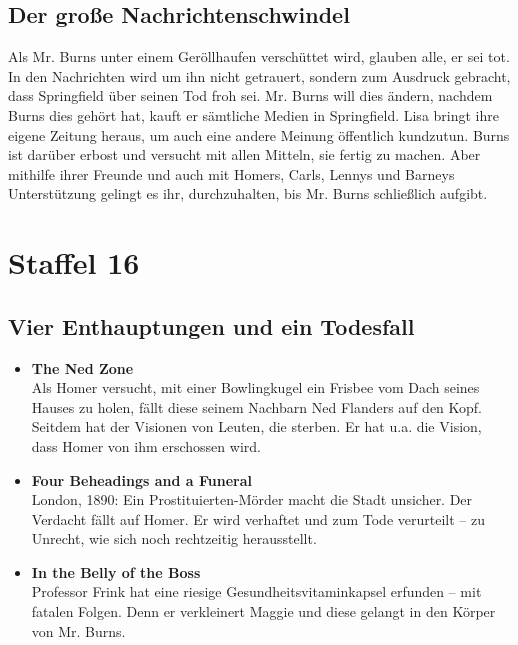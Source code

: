\subsection{Der große Nachrichtenschwindel}
Als Mr. Burns unter einem Geröllhaufen verschüttet wird, glauben alle, er sei tot. In den Nachrichten wird um ihn nicht getrauert, sondern zum Ausdruck gebracht, dass Springfield über seinen Tod froh sei. Mr. Burns will dies ändern, nachdem Burns dies gehört hat, kauft er sämtliche Medien in Springfield. Lisa bringt ihre eigene Zeitung heraus, um auch eine andere Meinung öffentlich kundzutun. Burns ist darüber erbost und versucht mit allen Mitteln, sie fertig zu machen. Aber mithilfe ihrer Freunde und auch mit Homers, Carls, Lennys und Barneys Unterstützung gelingt es ihr, durchzuhalten, bis Mr. Burns schließlich aufgibt.



\section{Staffel 16}
 	
\subsection{Vier Enthauptungen und ein Todesfall}
\begin{itemize}
	\item \textbf{The Ned Zone}\\ Als Homer versucht, mit einer Bowlingkugel ein Frisbee vom Dach seines Hauses zu holen, fällt diese seinem Nachbarn Ned Flanders auf den Kopf. Seitdem hat der Visionen von Leuten, die sterben. Er hat u.a. die Vision, dass Homer von ihm erschossen wird.
	\item \textbf{Four Beheadings and a Funeral}\\ London, 1890: Ein Prostituierten-Mörder macht die Stadt unsicher. Der Verdacht fällt auf Homer. Er wird verhaftet und zum Tode verurteilt -- zu Unrecht, wie sich noch rechtzeitig herausstellt. 
	\item \textbf{In the Belly of the Boss} \\ Professor Frink hat eine riesige Gesundheitsvitaminkapsel erfunden -- mit fatalen Folgen. Denn er verkleinert Maggie und diese gelangt in den Körper von Mr. Burns. 
\end{itemize}

